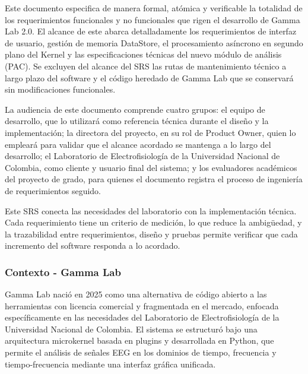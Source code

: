 \documentclass[12pt, letterpaper]{article}
\begin{document}
Este documento especifica de manera formal, atómica y verificable la totalidad de los requerimientos funcionales y no funcionales que rigen el desarrollo de Gamma Lab 2.0. El alcance de este abarca detalladamente los requerimientos de interfaz de usuario, gestión de memoria DataStore, el procesamiento asíncrono en segundo plano del Kernel y las especificaciones técnicas del nuevo módulo de análisis (PAC). Se excluyen del alcance del SRS las rutas de mantenimiento técnico a largo plazo del software y el código heredado de Gamma Lab que se conservará sin modificaciones funcionales.

La audiencia de este documento comprende cuatro grupos: el equipo de desarrollo, que lo utilizará como referencia técnica durante el diseño y la implementación; la directora del proyecto, en su rol de Product Owner, quien lo empleará para validar que el alcance acordado se mantenga a lo largo del desarrollo; el Laboratorio de Electrofisiología de la Universidad Nacional de Colombia, como cliente y usuario final del sistema; y los evaluadores académicos del proyecto de grado, para quienes el documento registra el proceso de ingeniería de requerimientos seguido.

Este SRS conecta las necesidades del laboratorio con la implementación técnica. Cada requerimiento tiene un criterio de medición, lo que reduce la ambigüedad, y la trazabilidad entre requerimientos, diseño y pruebas permite verificar que cada incremento del software responda a lo acordado.

\subsubsection{Contexto - Gamma Lab}

Gamma Lab nació en 2025 \cite{ref13} como una alternativa de código abierto a las herramientas con licencia comercial y fragmentada en el mercado, enfocada específicamente en las necesidades del Laboratorio de Electrofisiología de la Universidad Nacional de Colombia. El sistema se estructuró bajo una arquitectura microkernel basada en plugins y desarrollada en Python, que permite el análisis de señales EEG en los dominios de tiempo, frecuencia y tiempo-frecuencia mediante una interfaz gráfica unificada.
\end{document}
